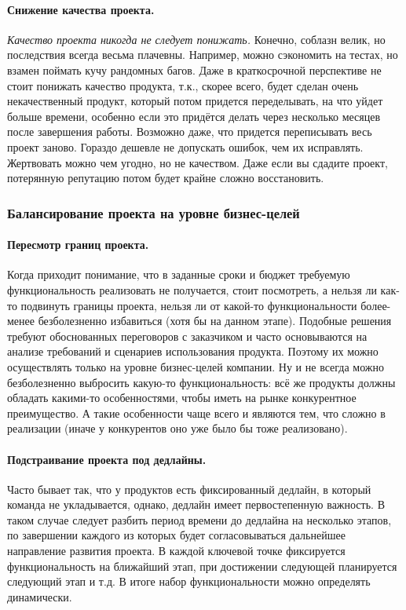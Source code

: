 \documentclass{../../text-style}
\begin{document}
\paragraph{Снижение качества проекта.} \emph{Качество проекта никогда не следует понижать.} Конечно, соблазн велик, но последствия всегда весьма плачевны. Например, можно сэкономить на тестах, но взамен поймать кучу рандомных багов. Даже в краткосрочной перспективе не стоит понижать качество продукта, т.к., скорее всего, будет сделан очень некачественный продукт, который потом придется переделывать, на что уйдет больше времени, особенно если это придётся делать через несколько месяцев после завершения работы. Возможно даже, что придется переписывать весь проект заново. Гораздо дешевле не допускать ошибок, чем их исправлять. Жертвовать можно чем угодно, но не качеством. Даже если вы сдадите проект, потерянную репутацию потом будет крайне сложно восстановить.

\subsubsection{Балансирование проекта на уровне бизнес-целей}

\paragraph{Пересмотр границ проекта.} Когда приходит понимание, что в заданные сроки и бюджет требуемую функциональность реализовать не получается, стоит посмотреть, а нельзя ли как-то подвинуть границы проекта, нельзя ли от какой-то функциональности более-менее безболезненно избавиться (хотя бы на данном этапе). Подобные решения требуют обоснованных переговоров с заказчиком и часто основываются на анализе требований и сценариев использования продукта. Поэтому их можно осуществлять только на уровне бизнес-целей компании. Ну и не всегда можно безболезненно выбросить какую-то функциональность: всё же продукты должны обладать какими-то особенностями, чтобы иметь на рынке конкурентное преимущество. А такие особенности чаще всего и являются тем, что сложно в реализации (иначе у конкурентов оно уже было бы тоже реализовано).

\paragraph{Подстраивание проекта под дедлайны.} Часто бывает так, что у продуктов есть фиксированный дедлайн, в который команда не укладывается, однако, дедлайн имеет первостепенную важность. В таком случае следует разбить период времени до дедлайна на несколько этапов, по завершении каждого из которых будет согласовываться дальнейшее направление развития проекта. В каждой ключевой точке фиксируется функциональность на ближайший этап, при достижении следующей планируется следующий этап и т.д. В итоге набор функциональности можно определять динамически.
\end{document}
